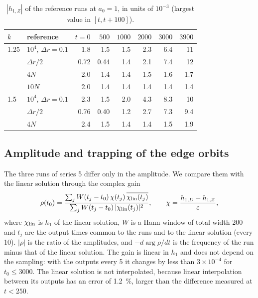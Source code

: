 \documentclass[11pt,a4paper]{article}
\begin{document}
\begin{table}[!htbp]
\centering
\small
\begin{tabular}{llrrrrrr}
\toprule
$k$ & reference & $t=0$ & $500$ & $1000$ & $2000$ & $3000$ & $3900$\\
\midrule
1.25 & $10^4$, $\Delta r=0.1$ & 1.8 & 1.5 & 1.5 & 2.3 & 6.4 & 11\\
 & $\Delta r/2$ & 0.72 & 0.44 & 1.4 & 2.1 & 7.4 & 12\\
 & $4N$ & 2.0 & 1.4 & 1.4 & 1.5 & 1.6 & 1.7\\
 & $10N$ & 2.0 & 1.4 & 1.4 & 1.4 & 1.4 & 1.4\\
\midrule
1.5 & $10^4$, $\Delta r=0.1$ & 2.3 & 1.5 & 2.0 & 4.3 & 8.3 & 10\\
 & $\Delta r/2$ & 0.76 & 0.40 & 1.2 & 2.7 & 7.3 & 9.4\\
 & $4N$ & 2.4 & 1.5 & 1.4 & 1.4 & 1.5 & 1.9\\
\bottomrule
\end{tabular}
\caption{$|h_{1,Z}|$ of the reference runs at $a_0=1$, in units of $10^{-3}$ (largest value in
$[t,t+100]$).}
\label{tab:ruidoZ}
\end{table}

\subsection{Amplitude and trapping of the edge orbits}
\label{sec:rebote}

The three runs of series 5 differ only in the amplitude. We compare them with the linear
solution through the complex gain
\[
  \rho(t_0)=\frac{\sum_jW(t_j-t_0)\,\chi(t_j)\,\overline{\chi_{\rm lin}(t_j)}}
                 {\sum_jW(t_j-t_0)\,|\chi_{\rm lin}(t_j)|^2},\qquad
  \chi=\frac{h_{1,D}-h_{1,Z}}{\varepsilon},
\]
where $\chi_{\rm lin}$ is $h_1$ of the linear solution, $W$ is a Hann window of total width 200
and $t_j$ are the output times common to the runs and to the linear solution (every 10).
$|\rho|$ is the ratio of the amplitudes, and $-d\arg\rho/dt$ is the frequency of the run minus
that of the linear solution. The gain is linear in $h_1$ and does not depend on the sampling:
with the outputs every 5 it changes by less than $3\times10^{-4}$ for $t_0\le3000$. The linear
solution is not interpolated, because linear interpolation between its outputs has an error
of \SI{1.2}{\%}, larger than the difference measured at $t<250$.
\end{document}
